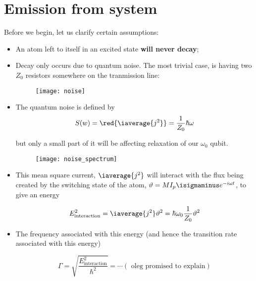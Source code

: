 
\section{Emission from system}
Before we begin, let us clarify certain assumptions:
\begin{itemize}
\item An  atom left to  itself in  an excited state  \textbf{will never
    decay};
\item Decay only occurs due to quantum noise. The most trivial case, is
  having two $ Z_0 $ resistors somewhere on the tranmission line:

\begin{figure}[h]
  \centering \texttt{[image: noise]}
\end{figure}

\noindent

\item The quantum noise \textbf{} is defined by
  \begin{equation}\label{key}
    S(w) = \red{\iaverage{j^2}} = \frac{1}{Z_0}\hbar\omega
  \end{equation}

  \noindent but only a small part of it will be affecting relaxation of
  our $ \omega_0 $ qubit.

\begin{figure}[h]
  \centering \texttt{[image: noise\_spectrum]}
\end{figure}

\noindent

\item This mean  square current, $ \iaverage{j^2} $  will interact with
  the  flux  being  created  by   the  switching  state  of  the  atom,
  $ \vartheta = MI_p\isigmaminus e^{-i\omega t} $, to give an energy

  \begin{equation}\label{key}
    E_\text{interaction}^2 = \iaverage{j^2}\vartheta^2 = \hbar\omega_0\frac{1}{Z_0}\vartheta^2
  \end{equation}

\item  The  frequency  associated  with  this  energy  (and  hence  the
  transition rate associated with this energy)

  \begin{equation}\label{key}
    \Gamma = \sqrt{\frac{E_\text{interaction}^2}{\hbar^2}} = \cdots (\text{ oleg promised to explain})
  \end{equation}
\end{itemize}


